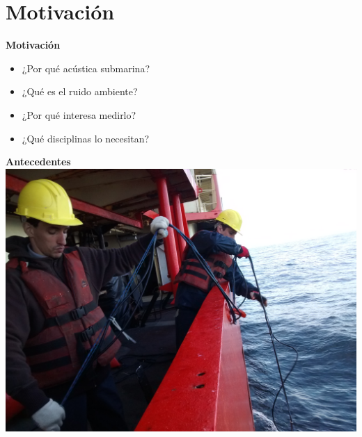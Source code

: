 \documentclass[11pt, xcolor={table,xcdraw}]{beamer}
\begin{document}
\section{Motivación}

\begin{frame}{\textbf{\LARGE{Motivación}}}
\fontsize{18pt}{18}\selectfont
	\vspace{-.7cm}
	\centering
	\begin{itemize}
	\item ¿Por qué acústica submarina?
	\vspace{15px}
	\item ¿Qué es el ruido ambiente?
	\vspace{15px}
	\item ¿Por qué interesa medirlo?
	\vspace{15px}	
	\item ¿Qué disciplinas lo necesitan?
	\end{itemize}
\end{frame}

\begin{frame}{\textbf{\LARGE{Antecedentes}}}
	\vspace{-.6cm}
		\includegraphics[width=.9\textwidth]{./imagenes/antecedentes.jpg}
\end{frame}
\end{document}
